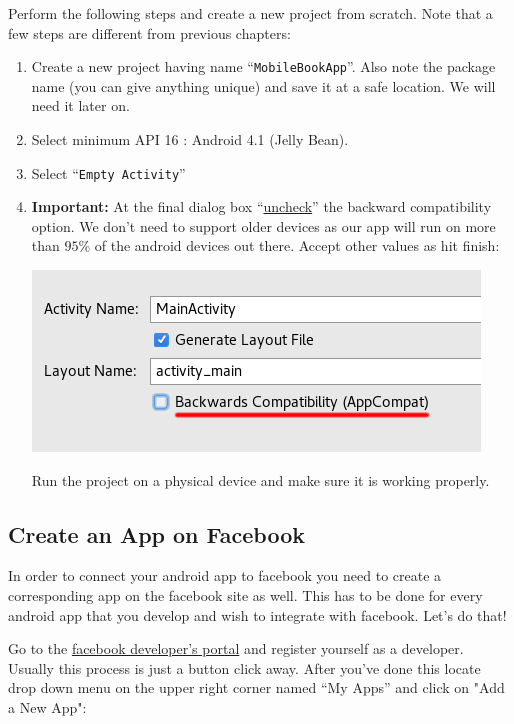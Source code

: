 Perform the following steps and create a new project from scratch. Note that a few steps are different from previous chapters:
\begin{enumerate}
	\item Create a new project having name ``\texttt{MobileBookApp}''. Also note the package name (you can give anything unique) and save it at a safe location. We will need it later on.
	\item Select minimum API 16 : Android 4.1 (Jelly Bean).
	\item Select ``\texttt{Empty Activity}''
	\item \textbf{Important:} At the final dialog box ``\underline{uncheck}'' the backward compatibility option. We don't need to support older devices as our app will run on more than $95\%$ of the android devices out there. Accept other values as hit finish:
	
	\begin{center}
		\includegraphics[scale=\SourceCodeScale]{chapters/ch12/images/1}
	\end{center}
	
	Run the project on a physical device and make sure it is working properly.
\end{enumerate}	

\subsection{Create an App on Facebook}
\label{FBI:createApponFacebook}
In order to connect your android app to facebook you need to create a corresponding app on the facebook site as well. This has to be done for every android app that you develop and wish to integrate with facebook. Let's do that!

Go to the \href{https://developers.facebook.com/}{facebook developer's portal} and register yourself as a developer. Usually this process is just a button click away. After you've done this locate drop down menu on the upper right corner named ``My Apps'' and click on "Add a New App":

